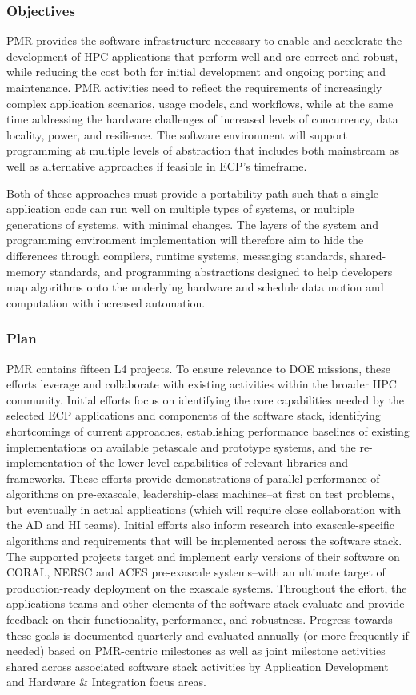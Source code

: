 \subsubsection{Objectives}
PMR provides the software infrastructure necessary to enable and accelerate the development of HPC applications that perform well and are correct and robust, while reducing the cost both for initial development and ongoing porting and maintenance. PMR activities need to reflect the requirements of increasingly complex application scenarios, usage models, and workflows, while at the same time addressing the hardware challenges of increased levels of concurrency, data locality, power, and resilience. The software environment will support programming at multiple levels of abstraction that includes both mainstream as well as alternative approaches if feasible in ECP’s timeframe. 

Both of these approaches must provide a portability path such that a single application code can run well on multiple types of systems, or multiple generations of systems, with minimal changes. The layers of the system and programming environment implementation will therefore aim to hide the differences through compilers, runtime systems, messaging standards, shared-memory standards, and programming abstractions designed to help developers map algorithms onto the underlying hardware and schedule data motion and computation with increased automation.
\subsubsection{Plan}
PMR contains fifteen L4 projects. To ensure relevance to DOE missions, these efforts leverage and collaborate with existing activities within the broader HPC community. Initial efforts focus on identifying the core capabilities needed by the selected ECP applications and components of the software stack, identifying shortcomings of current approaches, establishing performance baselines of existing implementations on available petascale and prototype systems, and the re-implementation of the lower-level capabilities of relevant libraries and frameworks. These efforts provide demonstrations of parallel performance of algorithms on pre-exascale, leadership-class machines--at first on test problems, but eventually in actual applications (which will require close collaboration with the AD and HI teams). Initial efforts also inform research into exascale-specific algorithms and requirements that will be implemented across the software stack. The supported projects target and implement early versions of their software on CORAL, NERSC and ACES pre-exascale systems--with an ultimate target of production-ready deployment on the exascale systems. Throughout the effort, the applications teams and other elements of the software stack evaluate and provide feedback on their functionality, performance, and robustness. Progress towards these goals is documented quarterly and evaluated annually (or more frequently if needed) based on PMR-centric milestones as well as joint milestone activities shared across associated software stack activities by Application Development and Hardware \& Integration focus areas.

